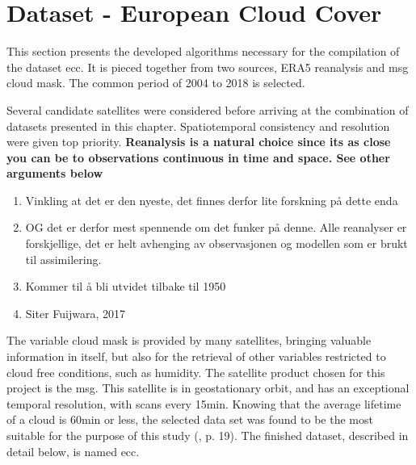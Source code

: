 \section{Dataset - European Cloud Cover }
This section presents the developed algorithms necessary for the compilation of the dataset \acrfull{ecc}. It is pieced together from two sources, ERA5 reanalysis and \acrfull{msg} cloud mask. The common period of 2004 to 2018 is selected.

Several candidate satellites were considered before arriving at the combination of datasets presented in this chapter. Spatiotemporal consistency and resolution were given top priority. \textbf{Reanalysis is a natural choice since its as close you can be to observations continuous in time and space. See other arguments below}
\begin{enumerate}
    \item Vinkling at det er den nyeste, det finnes derfor lite forskning på dette enda 
    \item OG det er derfor mest spennende om det funker på denne. Alle reanalyser er forskjellige, det er helt avhenging av observasjonen og modellen som er brukt til assimilering. 
    \item Kommer til å bli utvidet tilbake til 1950
    \item Siter Fuijwara, 2017
\end{enumerate}


The variable cloud mask is provided by many satellites, bringing valuable information in itself, but also for the retrieval of other variables restricted to cloud free conditions, such as humidity. The satellite product chosen for this project is the \acrfull{msg}. This satellite is in geostationary orbit, and has an exceptional temporal resolution, with scans every 15min. Knowing that the average lifetime of a cloud is 60min or less, the selected data set was found to be the most suitable for the purpose of this study (\cite{lohmann2016}, p. 19). The finished dataset, described in detail below, is named \acrfull{ecc}. 

